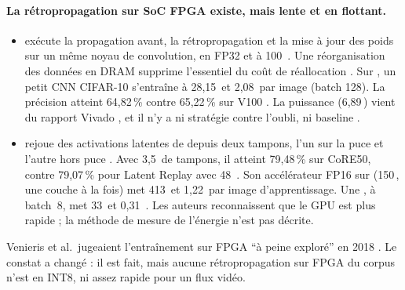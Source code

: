 \paragraph{La rétropropagation sur SoC FPGA existe, mais lente et en flottant.}
\begin{itemize}
  \item \textbf{} \citep{arxiv-2202.10935-ef-train-enable-efficient-device}\pp{}
    exécute la propagation avant, la rétropropagation et la mise à jour des poids sur un même
    noyau de convolution, en FP32 et à 100\, . Une réorganisation des
    données en DRAM supprime l'essentiel du coût de réallocation . Sur
    , un petit CNN CIFAR-10 s'entraîne à 28,15\, et 2,08\, par image (batch
    128). La précision atteint 64,82\,\% contre 65,22\,\% sur V100 . La
    puissance (6,89\,) vient du rapport Vivado , et il n'y a ni stratégie contre
    l'oubli, ni baseline .
  \item \textbf{} \citep{2024-aggarwal-chameleon-dual-memory-replay-online} rejoue
    des activations latentes de  depuis deux tampons, l'un sur la puce et l'autre
    hors puce . Avec 3,5\, de tampons, il atteint 79,48\,\% sur CoRE50, contre
    79,07\,\% pour Latent Replay avec 48\, . Son accélérateur FP16 sur 
    (150\,, une couche à la fois) met 413\, et 1,22\, par image d'apprentissage. Une
    , à batch~8, met 33\, et 0,31\, . Les auteurs
    reconnaissent que le GPU est plus rapide  ; la méthode de mesure de l'énergie
    n'est pas décrite.
\end{itemize}
Venieris et al.\ jugeaient l'entraînement sur FPGA \enquote{à peine exploré} en 2018
\citep[§3.2]{2018-venieris-toolflows-mapping-convolutional-neural-networks}. Le constat a
changé : il est fait, mais aucune rétropropagation sur FPGA du corpus n'est en INT8, ni
assez rapide pour un flux vidéo.

